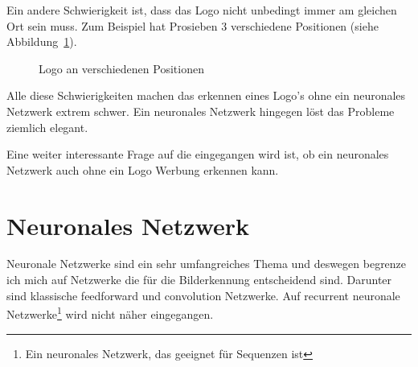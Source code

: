 \documentclass[12pt,a4paper]{report}
\begin{document}
Ein andere Schwierigkeit ist, dass das Logo nicht unbedingt immer am gleichen Ort sein muss.
Zum Beispiel hat Prosieben 3 verschiedene Positionen (siehe Abbildung~\ref{fig:logo3}).
\begin{figure}[h]%
    \centering
    \qquad
    \qquad
    \caption{Logo an verschiedenen Positionen}%
    \label{fig:logo3}%
\end{figure}
Alle diese Schwierigkeiten machen das erkennen eines Logo's ohne ein neuronales Netzwerk extrem schwer.
Ein neuronales Netzwerk hingegen löst das Probleme ziemlich elegant.

Eine weiter interessante Frage auf die eingegangen wird ist, ob ein neuronales Netzwerk auch ohne ein Logo Werbung erkennen kann.

\section{Neuronales Netzwerk}
Neuronale Netzwerke sind ein sehr umfangreiches Thema und deswegen begrenze ich mich auf Netzwerke die für die Bilderkennung entscheidend sind.
Darunter sind klassische feedforward und convolution Netzwerke.
Auf recurrent neuronale Netzwerke\footnote{Ein neuronales Netzwerk, das geeignet für Sequenzen ist} wird nicht näher eingegangen.
\end{document}
